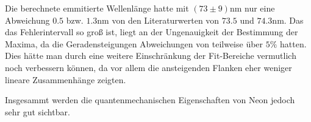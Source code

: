 \documentclass[12pt,a4paper,titlepage,headinclude,bibtotoc]{scrartcl}
\begin{document}
Die berechnete emmitierte Wellenlänge hatte mit $(73\pm9)\si{\nano\metre}$ nur eine Abweichung $0.5$ bzw. $1.3\si{\nano\metre}$ von den Literaturwerten von $73.5$ und $74.3\si{\nano\metre}$.
Das das Fehlerintervall so groß ist, liegt an der Ungenauigkeit der Bestimmung der Maxima, da die Geradensteigungen Abweichungen von teilweise über $5\%$ hatten.
Dies hätte man durch eine weitere Einschränkung der Fit-Bereiche vermutlich noch verbessern können, da vor allem die ansteigenden Flanken eher weniger lineare Zusammenhänge zeigten.

Insgesammt werden die quantenmechanischen Eigenschaften von Neon jedoch sehr gut sichtbar.




\end{document}
